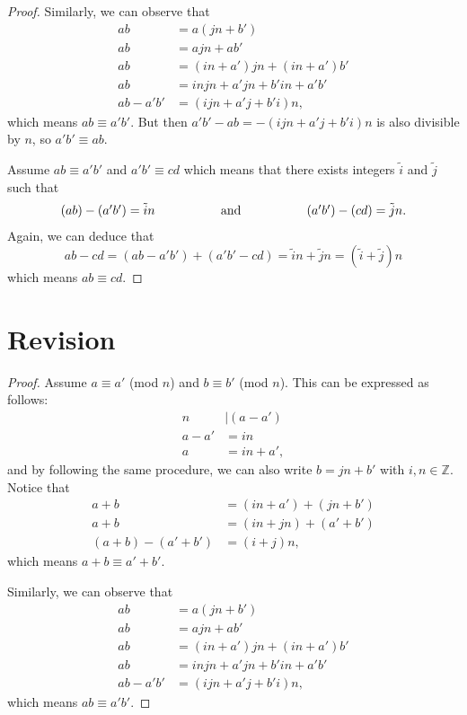 \documentclass[12pt]{amsart}
\newcommand{\Z}{\mathbb{Z}}
\begin{document}
\begin{proof}
Similarly, we can observe that
\begin{align*}
ab &= a(jn + b')\\
ab &= ajn + ab'\\
ab &= (in + a')jn + (in + a')b'\\
ab &= injn + a'jn + b'in + a'b'\\
ab - a'b' &= (ijn + a'j + b'i)n,
\end{align*}
which means $ab\equiv a'b'$.
But then $a'b' - ab = -(ijn + a'j + b'i)n$ is also divisible by $n$, so $a'b'\equiv ab$.

Assume $ab\equiv a'b'$ and $a'b'\equiv cd$ which means that there exists integers $\tilde{i}$ and $\tilde{j}$ such that
\[
\begin{tabular}{ c c c c c }
$(ab) - (a'b') = \tilde{i}n$ & \hspace{1cm} & and & \hspace{1cm} & $(a'b') - (cd) = \tilde{j}n$.
\end{tabular}
\]
Again, we can deduce that
\[
ab - cd = (ab-a'b') + (a'b' - cd) = \tilde{i}n + \tilde{j}n = (\tilde{i} + \tilde{j})n
\]
which means $ab \equiv cd$.
\end{proof}

\section*{Revision}

\begin{proof}
Assume $a\equiv a'$ (mod $n$) and $b\equiv b'$ (mod $n$).  This can be expressed as follows:
\begin{align*}
n&|(a-a')\\
a-a'&=in\\
a&=in+a',
\end{align*}
and by following the same procedure, we can also write $b=jn+b'$ with $i,n\in\Z$.  Notice that
\begin{align*}
a+b &= (in +a') + (jn + b')\\
a+b &= (in + jn) + (a' + b')\\
(a+b) - (a' + b') &= (i+j)n,
\end{align*}
which means $a+b\equiv a' + b'$.

Similarly, we can observe that
\begin{align*}
ab &= a(jn + b')\\
ab &= ajn + ab'\\
ab &= (in + a')jn + (in + a')b'\\
ab &= injn + a'jn + b'in + a'b'\\
ab - a'b' &= (ijn + a'j + b'i)n,
\end{align*}
which means $ab\equiv a'b'$.
\end{proof}
\end{document}
